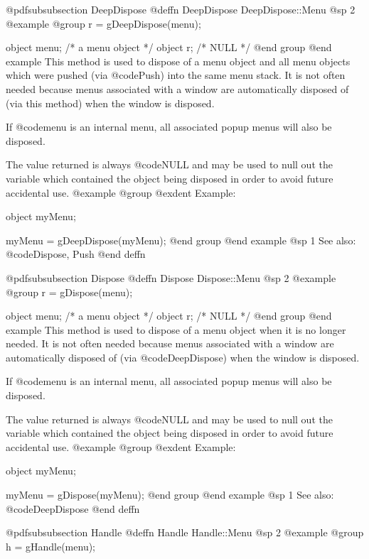 @pdfsubsubsection {DeepDispose}
@deffn {DeepDispose} DeepDispose::Menu
@sp 2
@example
@group
r = gDeepDispose(menu);

object  menu;   /*  a menu object    */
object  r;      /*  NULL             */
@end group
@end example
This method is used to dispose of a menu object and all menu objects
which were pushed (via @code{Push}) into the same menu stack.  It is not
often needed because menus associated with a window are automatically
disposed of (via this method) when the window is disposed.

If @code{menu} is an internal menu, all associated popup menus will
also be disposed.

The value returned is always @code{NULL} and may be used to null out
the variable which contained the object being disposed in order to
avoid future accidental use.
@example
@group
@exdent Example:

object  myMenu;

myMenu = gDeepDispose(myMenu);
@end group
@end example
@sp 1
See also:  @code{Dispose, Push}
@end deffn









@pdfsubsubsection {Dispose}
@deffn {Dispose} Dispose::Menu
@sp 2
@example
@group
r = gDispose(menu);

object  menu;   /*  a menu object   */
object  r;      /*  NULL            */
@end group
@end example
This method is used to dispose of a menu object when it is no longer
needed.  It is not often needed because menus associated with a window
are automatically disposed of (via @code{DeepDispose}) when the window
is disposed.

If @code{menu} is an internal menu, all associated popup menus will
also be disposed.

The value returned is always @code{NULL} and may be used to null out
the variable which contained the object being disposed in order to
avoid future accidental use.
@example
@group
@exdent Example:

object  myMenu;

myMenu = gDispose(myMenu);
@end group
@end example
@sp 1
See also:  @code{DeepDispose}
@end deffn












@pdfsubsubsection {Handle}
@deffn {Handle} Handle::Menu
@sp 2
@example
@group
h = gHandle(menu);

